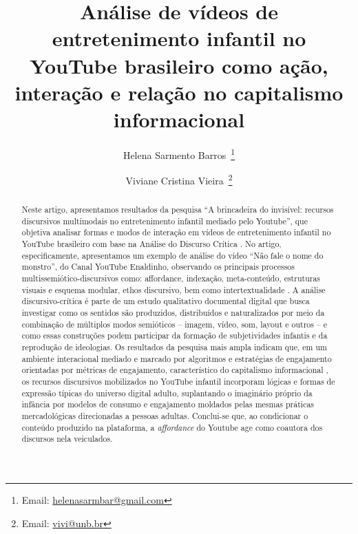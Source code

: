 \documentclass[portuguese]{textolivre}
\title{Análise de vídeos de entretenimento infantil no YouTube brasileiro como ação, interação e relação no capitalismo informacional}
\author[1]{Helena Sarmento Barros~\orcid{0009-0005-6794-4713}\thanks{Email: \href{mailto:helenasarmbar@gmail.com}{helenasarmbar@gmail.com}}}
\author[1]{Viviane Cristina Vieira~\orcid{0000-0003-4148-5414}\thanks{Email: \href{mailto:vivi@unb.br}{vivi@unb.br}}}
\affil[1]{Universidade de Brasília, Instituto de Letras, Programa de Pós-Graduação em Linguística, Brasília, DF, Brasil.}
\begin{document}
\maketitle

\begin{polyabstract}
\begin{abstract}
Neste artigo, apresentamos resultados da pesquisa “A brincadeira do invisível: recursos discursivos multimodais no entretenimento infantil mediado pelo Youtube”, que objetiva analisar formas e modos de interação em vídeos de entretenimento infantil no YouTube brasileiro com base na Análise do Discurso Crítica \cite{Fairclough2003AnalysingDiscourse,VieiraResende2016AnaliseDiscursoCritica,Vieira2024Decolonial}. No artigo, especificamente, apresentamos um exemplo de análise do vídeo “Não fale o nome do monstro”, do Canal YouTube Enaldinho, observando os principais processos multissemiótico-discursivos como: affordance, indexação, meta-conteúdo, estruturas visuais e esquema modular, ethos discursivo, bem como intertextualidade \cite{Benson2016DiscourseYouTube,ColetivaCiborga2022EtnografiaDigital,Fairclough2003AnalysingDiscourse,KressVanLeeuwen2020ReadingImages,Maingueneau2020GenerosWeb}. A análise discursivo-crítica é parte de um estudo qualitativo documental digital \cite{Paveau2021AnaliseDiscursoDigital} que busca investigar como os sentidos são produzidos, distribuídos e naturalizados por meio da combinação de múltiplos modos semióticos – imagem, vídeo, som, layout e outros – e como essas construções podem participar da formação de subjetividades infantis e da reprodução de ideologias. Os resultados da pesquisa mais ampla indicam que, em um ambiente interacional mediado e marcado por algoritmos e estratégias de engajamento orientadas por métricas de engajamento, característico do capitalismo informacional \cite{Han2018Psicopolitica}, os recursos discursivos mobilizados no YouTube infantil incorporam lógicas e formas de expressão típicas do universo digital adulto, suplantando o imaginário próprio da infância por modelos de consumo e engajamento moldados pelas mesmas práticas mercadológicas direcionadas a pessoas adultas. Conclui-se que, ao condicionar o conteúdo produzido na plataforma, a \textit{affordance} do Youtube age como coautora dos discursos nela veiculados.

\end{abstract}


\end{polyabstract}
\end{document}
